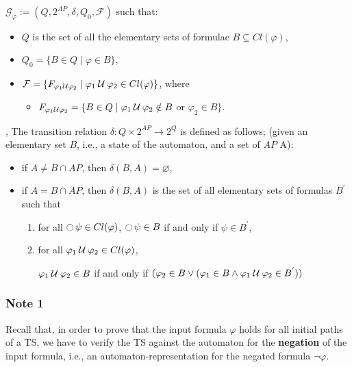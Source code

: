 \documentclass{article}
\begin{document}
$\mathcal{G}_{\varphi} := (Q, 2^{AP}, \delta, Q_0, \mathcal{F})$ such that: 
\begin{itemize}
    \item $Q$ is the set of all the elementary sets of formulae $B \subseteq Cl(\varphi)$,
    \item $Q_0 = \{ B \in Q \mid \varphi \in B\}$,
    \item $\mathcal{F} = \{ F_{\varphi_1 \mathbin{\mathcal{U}} \varphi_2} \mid \varphi_1 \mathbin{\mathcal{U}} \varphi_2 \in Cl(\varphi) \} $, where 
            \begin{itemize}
                \item $F_{\varphi_1 \mathbin{\mathcal{U}} \varphi_2} = \{ B \in Q \mid \varphi_1 \mathbin{\mathcal{U}} \varphi_2 \notin B$ or $\varphi_2 \in B \}$.
            \end{itemize}
\end{itemize}
, 
The transition  relation $\delta : Q \times 2^{AP} \rightarrow 2^Q$ is defined as follows;
(given an elementary set $B$, i.e., a state of the automaton, and a set of $AP$ A):
\begin{itemize}
    \item if $A \neq B \cap AP$, then $\delta(B,A) = \varnothing$,
    \item if $A = B \cap AP$, then $\delta(B,A)$ is the set of all elementary sets of formulas $B^{'}$ such that 
            \begin{enumerate}
                \item for all $\mathop{\ocircle}{\psi} \in Cl(\varphi)$, $\mathop{\ocircle}{\psi} \in B$ if and only if $\psi \in B^{'}$,
                \item for all $\varphi_1 \mathbin{\mathcal{U}} \varphi_2 \in Cl(\varphi)$, 
                
                
                    \begin{center}
                        $\varphi_1 \mathbin{\mathcal{U}} \varphi_2 \in B$ if and only if $(\varphi_2 \in B \lor (\varphi_1 \in B \land \varphi_1 \mathbin{\mathcal{U}} \varphi_2 \in B^{'}))$
                    \end{center}
            \end{enumerate}
\end{itemize}




\subsubsection*{Note 1}
Recall that, in order to prove that the input formula $\varphi$ holds for all initial paths of a TS, we have 
to verify the TS against the automaton for the \textbf{negation} of the input formula, i.e., an automaton-representation 
for the negated formula $\neg \varphi$.
\end{document}
